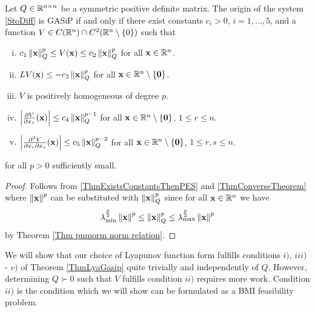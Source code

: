 \documentclass[a4paper,12pt,twoside,BCOR=10mm]{scrbook}
\begin{document}
\begin{theorem}\label{ThmLyaGasip}
Let $Q\in \mathbb{R}^{n\times n}$ be a symmetric positive definite matrix. The origin of the system \eqref{StoDiff} is  GASiP if and only if there exist constants $c_i > 0$, $i = 1,\ldots, 5$, and a function $V \in C(\mathbb{R}^{n}) \cap C^2(\mathbb{R}^{n} \setminus \{0\})$ such that
\begin{enumerate}[i)]
    \item $c_1 \left\lVert\mathbf{x}\right\rVert_Q^p \leq V(\mathbf{x}) \leq c_2 \left\lVert\mathbf{x}\right\rVert_Q^p$ for all $\mathbf{x} \in \mathbb{R}^{n}$.
    \item $LV(\mathbf{x}) \leq -c_3\left\lVert\mathbf{x}\right\rVert_Q^p$ for all $\mathbf{x} \in \mathbb{R}^{n} \setminus \{\mathbf{0}\}$.
    \item $V$ is positively homogeneous of degree $p$.
    \item $\left\lvert \frac{\partial V}{\partial x_r}(\mathbf{x})\right\rvert \leq c_4 \left\lVert\mathbf{x}\right\rVert_{Q}^{p-1}$ for all $\mathbf{x} \in \mathbb{R}^{n} \setminus \{\mathbf{0}\}$, $1 \leq r \leq n$.
    \item $\left\lvert \frac{\partial ^2 V}{\partial x_r \partial x_s}(\mathbf{x}) \right\rvert \leq c_5 \left\lVert\mathbf{x}\right\rVert_{Q}^{p-2}$ for all $\mathbf{x} \in \mathbb{R}^{n} \setminus \{\mathbf{0}\}$, $1 \leq r,s \leq n$.
\end{enumerate}
for all $p > 0$ sufficiently small. 
\end{theorem}
\begin{proof}
Follows from \ref{ThmExistsConstantsThenPES} and \ref{ThmConverseTheorem} where $\left\lVert\mathbf{x}\right\rVert^p$ can be substituted with $\left\lVert\mathbf{x}\right\rVert_Q^p$ since for all $\mathbf{x} \in \mathbb{R}^{n}$ we have
\begin{align*}
    \lambda_{\min}^\frac{p}{2}\left\lVert\mathbf{x}\right\rVert^p \leq \left\lVert\mathbf{x}\right\rVert_Q^p \leq \lambda_{\max}^\frac{p}{2}\left\lVert\mathbf{x}\right\rVert^p
\end{align*}
by Theorem \ref{Thm pnmorm norm relation}.
\end{proof}

We will show that our choice of Lyapunov function form fulfills conditions $i)$, $iii)$ - $v)$ of Theorem \ref{ThmLyaGasip} quite trivially and independently of $Q$. However, determining $Q \succ 0$ such that $V$ fulfills condition $ii)$ requires more work. Condition $ii)$ is the condition which we will show can be formulated as a BMI feasibility problem.
\end{document}
